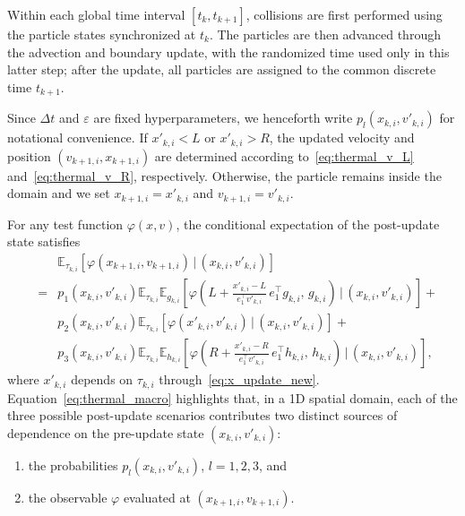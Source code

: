 \documentclass[12pt,nopreprintline]{elsarticle}
\begin{document}
{Within each global time interval $[t_k,t_{k+1}]$, collisions are first performed using the particle states synchronized at $t_k$. The particles are then advanced through the advection and boundary update, with the randomized time used only in this latter step; after the update, all particles are assigned to the common discrete time $t_{k+1}$.}

Since $\Delta t$ and $\varepsilon$ are fixed hyperparameters, we henceforth write $p_l(x_{k,i}, v'_{k,i})$ for notational convenience. If $x'_{k,i} < L$ or $x'_{k,i} > R$, the updated velocity and position $(v_{k+1,i}, x_{k+1,i})$ are determined according to~\eqref{eq:thermal_v_L} and~\eqref{eq:thermal_v_R}, respectively. Otherwise, the particle remains inside the domain and we set $x_{k+1,i} = x'_{k,i}$ and $v_{k+1,i} = v'_{k,i}$.

For any test function $\varphi(x,v)$, the conditional expectation of the post-update state satisfies
\begin{eqnarray}
\label{eq:thermal_macro}
&& \mathbb E_{\tau_{k,i}}\!\left[\varphi(x_{k+1,i},v_{k+1,i}) \,\big|\, (x_{k,i}, v'_{k,i})\right]\\
&=& p_1\!\left(x_{k,i}, v'_{k,i}\right)
\mathbb E_{\tau_{k,i}} \mathbb E_{g_{k,i}}
\left[
\varphi\!\left(
L + \frac{x'_{k,i}-L}{e_1^\top v'_{k,i}}\, e_1^\top g_{k,i},
\, g_{k,i}
\right)
\,\big|\, (x_{k,i}, v'_{k,i})\right] +\nonumber \\
&& p_2\!\left(x_{k,i}, v'_{k,i}\right)
\mathbb E_{\tau_{k,i}}
\left[
\varphi(x'_{k,i}, v'_{k,i})
\,\big|\, (x_{k,i}, v'_{k,i})\right] + \nonumber \\
&&  p_3\!\left(x_{k,i}, v'_{k,i}\right)
\mathbb E_{\tau_{k,i}}\mathbb E_{h_{k,i}}
\left[
\varphi\!\left(
R + \frac{x'_{k,i}-R}{e_1^\top v'_{k,i}}\, e_1^\top h_{k,i},
\, h_{k,i}
\right)
\,\big|\, (x_{k,i}, v'_{k,i})\right],\nonumber
\end{eqnarray}
where $x'_{k,i}$ depends on $\tau_{k,i}$ through~\eqref{eq:x_update_new}. Equation~\eqref{eq:thermal_macro} highlights that, in a 1D spatial domain, each of the three possible post-update scenarios contributes two distinct sources of dependence on the pre-update state $(x_{k,i}, v'_{k,i})$:
\begin{enumerate}
    \item the probabilities $p_l(x_{k,i}, v'_{k,i})$, $l=1,2,3$, and
    \item the observable $\varphi$ evaluated at $(x_{k+1,i}, v_{k+1,i})$.
\end{enumerate}
\end{document}
